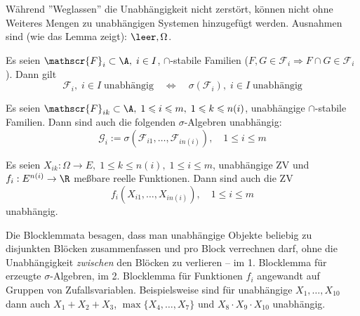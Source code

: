 \documentclass[11pt, a4paper]{article}
\begin{document}
\begin{note}
    Während ''Weglassen'' die Unabhängigkeit nicht zerstört, können nicht ohne Weiteres Mengen zu unabhängigen Systemen hinzugefügt werden. Ausnahmen sind (wie das Lemma zeigt): $\leer, \Omega$.
\end{note}

\begin{theorem}
    Es seien $\mathscr{F}_i \subset \A, \; i \in I$, $\cap$-stabile Familien ($F, G \in \mathscr{F}_i \Rightarrow F \cap G \in \mathscr{F}_i$). Dann gilt
    $$\mathscr{F}_i, \; i \in I \; \text{unabhängig} \quad \Longleftrightarrow \quad \sigma(\mathscr{F}_i), \; i \in I \; \text{unabhängig}$$
\end{theorem}

\begin{corollary}[1. Blocklemma]\Theorem
    Es seien $\mathscr{F}_{ik} \subset \A, \; 1 \leqslant i \leqslant m, \; 1 \leqslant k \leqslant n(i)$, unabhängige $\cap$-stabile Familien. Dann sind auch die folgenden $\sigma$-Algebren unabhängig:
    $$\mathscr{G}_i := \sigma(\mathscr{F}_{i1}, \ldots, \mathscr{F}_{i n(i)}), \quad 1 \leqslant i \leqslant m$$
\end{corollary}

\begin{corollary}[2. Blocklemma]\Theorem
    Es seien $X_{ik}: \Omega \to E, \; 1 \leqslant k \leqslant n(i), \; 1 \leqslant i \leqslant m$, unabhängige ZV und $f_i: E^{n(i)} \to \R$ meßbare reelle Funktionen. Dann sind auch die ZV
    $$f_i(X_{i1}, \ldots, X_{i n(i)}), \quad 1 \leqslant i \leqslant m$$
    unabhängig.
\end{corollary}

\begin{note}
    Die Blocklemmata besagen, dass man unabhängige Objekte beliebig zu disjunkten Blöcken zusammenfassen und pro Block verrechnen darf, ohne die Unabhängigkeit \emph{zwischen} den Blöcken zu verlieren -- im 1. Blocklemma für erzeugte $\sigma$-Algebren, im 2. Blocklemma für Funktionen $f_i$ angewandt auf Gruppen von Zufallsvariablen. Beispielsweise sind für unabhängige $X_1,\ldots,X_{10}$ dann auch $X_1+X_2+X_3$, $\max\{X_4,\ldots,X_7\}$ und $X_8\cdot X_9\cdot X_{10}$ unabhängig.
\end{note}
\end{document}

